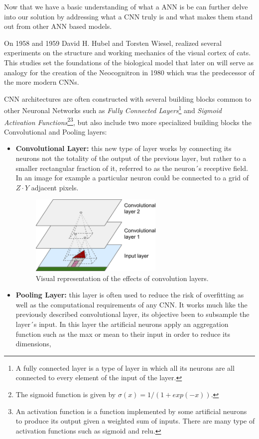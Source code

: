 \documentclass[12pt, a4paper]{article}
\begin{document}
	Now that we have a basic understanding of what a ANN is be can further delve into our solution by addressing what a CNN truly is and what makes them stand out from other ANN based models.
	
	On 1958\cite{cortex58} and 1959\cite{cortex59} David H. Hubel and Torsten Wiesel, realized several experiments on the structure and working mechanics of the visual cortex of cats. This studies set the foundations of the biological model that later on will serve as analogy for the creation of the Neocognitron\cite{neocognitron} in 1980 which was the predecessor of the more modern CNNs.
	
	CNN architectures are often constructed with several building blocks common to other Neuronal Networks such as \textit{Fully Connected Layers}\footnote{A fully connected layer is a type of layer in which all its neurons are all connected to every element of the input of the layer.} and \textit{Sigmoid Activation Functions}\footnote{The sigmoid function is given by $\sigma(x) = 1/(1+exp(-x))$.}\footnote{An activation function is a function implemented by some artificial neurons to produce its output given a weighted sum of inputs. There are many type of activation functions such as sigmoid and relu. }, but also include two more specialized building blocks the Convolutional and Pooling layers:
	
	\begin{itemize}
		
		\item \textbf{Convolutional Layer:} this new type of layer works by connecting its neurons not the totality of the output of the previous layer, but rather to a smaller rectangular fraction of it, referred to as the neuron´s receptive field. In an image for example a particular neuron could be connected to a grid of $Z \cdot Y$ adjacent pixels. 
		
		\begin{figure}[H]
			\centering
			\label{ConvLayer}
			\includegraphics[height=38mm]{img/convLayer.png}
			\caption{Visual representation of the effects of convolution layers.\cite{handsonmachinelearning}}
		\end{figure}
		
		\item \textbf{Pooling Layer:} this layer is often used to reduce the risk of overfitting as well as the computational requirements of any CNN. It works much like the previously described convolutional layer, its objective been to subsample the layer´s input. In this layer the artificial neurons apply an aggregation function such as the max or mean to their input in order to reduce its dimensions,
		
	\end{itemize}
	
\end{document}
